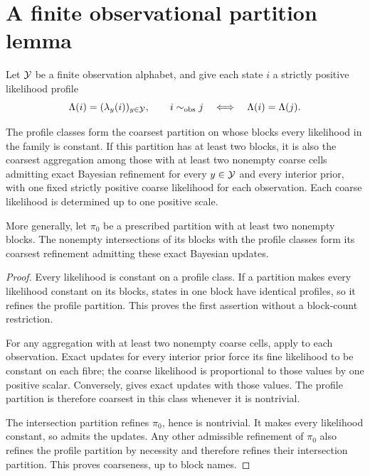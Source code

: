 \documentclass[11pt,oneside,openany]{book}
\numberwithin{equation}{section}
\begin{document}
\section{A finite observational partition lemma}\label{PRIQ:app:observation-partition}
Let $\mathcal Y$ be a finite observation alphabet, and give each state $i$ a strictly positive likelihood profile
\[
\Lambda(i)=(\lambda_y(i))_{y\in\mathcal Y},\qquad
i\sim_{\mathrm{obs}}j\quad\Longleftrightarrow\quad\Lambda(i)=\Lambda(j).
\]
\begin{PRIQproposition}\label{PRIQ:prop:coarsest-observation-partition}
The profile classes form the coarsest partition on whose blocks every likelihood in the family is constant. If this partition has at least two blocks, it is also the coarsest aggregation among those with at least two nonempty coarse cells admitting exact Bayesian refinement for every $y\in\mathcal Y$ and every interior prior, with one fixed strictly positive coarse likelihood for each observation. Each coarse likelihood is determined up to one positive scale.

More generally, let $\pi_0$ be a prescribed partition with at least two nonempty blocks. The nonempty intersections of its blocks with the profile classes form its coarsest refinement admitting these exact Bayesian updates.
\end{PRIQproposition}
\begin{proof}
Every likelihood is constant on a profile class. If a partition makes every likelihood constant on its blocks, states in one block have identical profiles, so it refines the profile partition. This proves the first assertion without a block-count restriction.

For any aggregation with at least two nonempty coarse cells, apply  to each observation. Exact updates for every interior prior force its fine likelihood to be constant on each fibre; the coarse likelihood is proportional to those values by one positive scalar. Conversely,  gives exact updates with those values. The profile partition is therefore coarsest in this class whenever it is nontrivial.

The intersection partition refines $\pi_0$, hence is nontrivial. It makes every likelihood constant, so admits the updates. Any other admissible refinement of $\pi_0$ also refines the profile partition by necessity and therefore refines their intersection partition. This proves coarseness, up to block names.
\end{proof}
\end{document}
